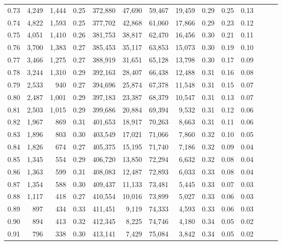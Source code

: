 \begin{tabular}{rrrrrrrrrrrrrr}
0.73 &  4,249 &  1,444 &  0.25 &  372,880 &   47,690 &  59,467 &  19,459 &  0.29 &  0.25 &      0.13 \\
0.74 &  4,822 &  1,593 &  0.25 &  377,702 &   42,868 &  61,060 &  17,866 &  0.29 &  0.23 &      0.12 \\
0.75 &  4,051 &  1,410 &  0.26 &  381,753 &   38,817 &  62,470 &  16,456 &  0.30 &  0.21 &      0.11 \\
0.76 &  3,700 &  1,383 &  0.27 &  385,453 &   35,117 &  63,853 &  15,073 &  0.30 &  0.19 &      0.10 \\
0.77 &  3,466 &  1,275 &  0.27 &  388,919 &   31,651 &  65,128 &  13,798 &  0.30 &  0.17 &      0.09 \\
0.78 &  3,244 &  1,310 &  0.29 &  392,163 &   28,407 &  66,438 &  12,488 &  0.31 &  0.16 &      0.08 \\
0.79 &  2,533 &    940 &  0.27 &  394,696 &   25,874 &  67,378 &  11,548 &  0.31 &  0.15 &      0.07 \\
0.80 &  2,487 &  1,001 &  0.29 &  397,183 &   23,387 &  68,379 &  10,547 &  0.31 &  0.13 &      0.07 \\
0.81 &  2,503 &  1,015 &  0.29 &  399,686 &   20,884 &  69,394 &   9,532 &  0.31 &  0.12 &      0.06 \\
0.82 &  1,967 &    869 &  0.31 &  401,653 &   18,917 &  70,263 &   8,663 &  0.31 &  0.11 &      0.06 \\
0.83 &  1,896 &    803 &  0.30 &  403,549 &   17,021 &  71,066 &   7,860 &  0.32 &  0.10 &      0.05 \\
0.84 &  1,826 &    674 &  0.27 &  405,375 &   15,195 &  71,740 &   7,186 &  0.32 &  0.09 &      0.04 \\
0.85 &  1,345 &    554 &  0.29 &  406,720 &   13,850 &  72,294 &   6,632 &  0.32 &  0.08 &      0.04 \\
0.86 &  1,363 &    599 &  0.31 &  408,083 &   12,487 &  72,893 &   6,033 &  0.33 &  0.08 &      0.04 \\
0.87 &  1,354 &    588 &  0.30 &  409,437 &   11,133 &  73,481 &   5,445 &  0.33 &  0.07 &      0.03 \\
0.88 &  1,117 &    418 &  0.27 &  410,554 &   10,016 &  73,899 &   5,027 &  0.33 &  0.06 &      0.03 \\
0.89 &    897 &    434 &  0.33 &  411,451 &    9,119 &  74,333 &   4,593 &  0.33 &  0.06 &      0.03 \\
0.90 &    894 &    413 &  0.32 &  412,345 &    8,225 &  74,746 &   4,180 &  0.34 &  0.05 &      0.02 \\
0.91 &    796 &    338 &  0.30 &  413,141 &    7,429 &  75,084 &   3,842 &  0.34 &  0.05 &      0.02 \\

\end{tabular}
